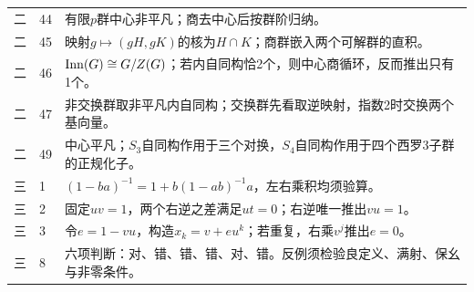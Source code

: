 \begin{longtable}{p{1.1cm}p{1.0cm}p{12.1cm}}
二&44&有限$p$群中心非平凡；商去中心后按群阶归纳。\\
二&45&映射$g\mapsto(gH,gK)$的核为$H\cap K$；商群嵌入两个可解群的直积。\\
二&46&$\operatorname{Inn}(G)\cong G/Z(G)$；若内自同构恰2个，则中心商循环，反而推出只有1个。\\
二&47&非交换群取非平凡内自同构；交换群先看取逆映射，指数2时交换两个基向量。\\
二&49&中心平凡；$S_3$自同构作用于三个对换，$S_4$自同构作用于四个西罗3子群的正规化子。\\\midrule
三&1&$(1-ba)^{-1}=1+b(1-ab)^{-1}a$，左右乘积均须验算。\\
三&2&固定$uv=1$，两个右逆之差满足$ut=0$；右逆唯一推出$vu=1$。\\
三&3&令$e=1-vu$，构造$x_k=v+eu^k$；若重复，右乘$v^j$推出$e=0$。\\
三&8&六项判断：对、错、错、错、对、错。反例须检验良定义、满射、保幺与非零条件。\\
\bottomrule
\end{longtable}
\normalsize
